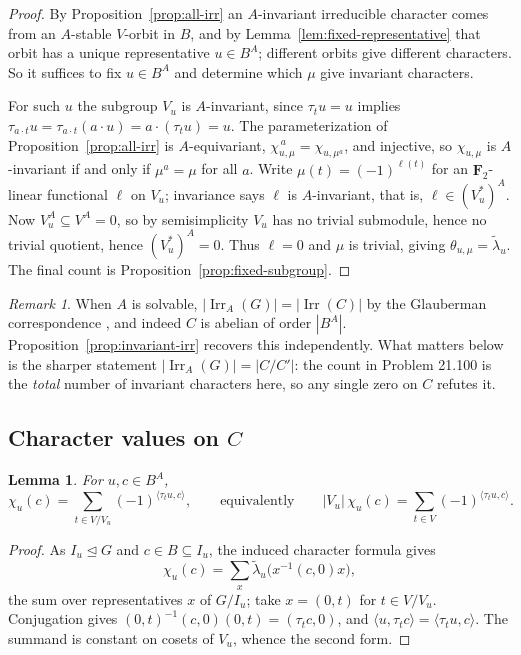 \documentclass[11pt]{article}
\newtheorem{lemma}[theorem]{Lemma}
\theoremstyle{definition}
\theoremstyle{remark}
\newtheorem{remark}[theorem]{Remark}
\newcommand{\F}{\mathbf F}
\newcommand{\Irr}{\operatorname{Irr}}
\begin{document}
\begin{proof}
By Proposition~\ref{prop:all-irr} an $A$-invariant irreducible
character comes from an $A$-stable $V$-orbit in $B$, and by
Lemma~\ref{lem:fixed-representative} that orbit has a unique
representative $u\in B^A$; different orbits give different characters.
So it suffices to fix $u\in B^A$ and determine which $\mu$ give
invariant characters.

For such $u$ the subgroup $V_u$ is $A$-invariant, since $\tau_tu=u$
implies $\tau_{a\cdot t}u=\tau_{a\cdot t}(a\cdot u)=a\cdot(\tau_tu)=u$.  The
parameterization of Proposition~\ref{prop:all-irr} is $A$-equivariant,
$\chi_{u,\mu}^{\,a}=\chi_{u,\mu^a}$, and injective, so $\chi_{u,\mu}$
is $A$-invariant if and only if $\mu^a=\mu$ for all $a$.  Write
$\mu(t)=(-1)^{\ell(t)}$ for an $\F_2$-linear functional $\ell$ on
$V_u$; invariance says $\ell$ is $A$-invariant, that is,
$\ell\in(V_u^*)^A$.  Now $V_u^A\subseteq V^A=0$, so by semisimplicity
$V_u$ has no trivial submodule, hence no trivial quotient, hence
$(V_u^*)^A=0$.  Thus $\ell=0$ and $\mu$ is trivial, giving
$\theta_{u,\mu}=\widetilde\lambda_u$.  The final count is
Proposition~\ref{prop:fixed-subgroup}.
\end{proof}

\begin{remark}
When $A$ is solvable, $|\Irr_A(G)|=|\Irr(C)|$ by the Glauberman
correspondence \cite{glauberman}, and indeed $C$ is abelian of order
$|B^A|$.  Proposition~\ref{prop:invariant-irr} recovers this
independently.  What matters below is the sharper statement
$|\Irr_A(G)|=|C/C'|$: the count in Problem 21.100 is the
\emph{total} number of invariant characters here, so any single zero on
$C$ refutes it.
\end{remark}

\subsection{Character values on \texorpdfstring{$C$}{C}}

\begin{lemma}\label{lem:value-formula}
For $u,c\in B^A$,
\[
 \chi_u(c)=\sum_{t\in V/V_u}(-1)^{\langle\tau_tu,c\rangle},
 \qquad\text{equivalently}\qquad
 |V_u|\,\chi_u(c)=\sum_{t\in V}(-1)^{\langle\tau_tu,c\rangle}.
\]
\end{lemma}

\begin{proof}
As $I_u\trianglelefteq G$ and $c\in B\subseteq I_u$, the induced
character formula gives
\[
 \chi_u(c)=\sum_x\widetilde\lambda_u\bigl(x^{-1}(c,0)x\bigr),
\]
the sum over representatives $x$ of $G/I_u$; take $x=(0,t)$ for
$t\in V/V_u$.
Conjugation gives $(0,t)^{-1}(c,0)(0,t)=(\tau_tc,0)$, and
$\langle u,\tau_tc\rangle=\langle\tau_tu,c\rangle$.  The summand is
constant on cosets of $V_u$, whence the second form.
\end{proof}
\end{document}
